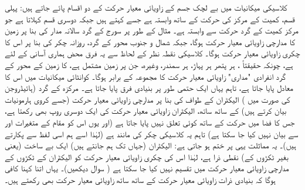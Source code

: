 کلاسیکی میکانیات میں بے لچک جسم کے زاویائی معیار حرکت کے دو اقسام پائے جاتے ہیں:  پہلی قسم،   کمیت کے مرکز کی  حرکت کے ساتھ وابستہ ہے جسے     کہتے ہیں جبکہ دوسری  قسم   
  کہلاتا ہے  جو مرکز کمیت کے گرد حرکت سے وابستہ ہے۔ مثال کے طور پر سورج کے گرد سالانہ مدار کی بنا پر زمین کا مدارچی زاویائی معیار حرکت ہوگا، جبکہ شمال و  جنوب محور کے گرد، روزانہ چکر کی بنا پر اس کا چکری زاویائی معیار حرکت ہوگا۔  کلاسیکی  نقطہ نظر کے لحاظ سے  یہ فرق  محض ہماری آسانی کے لئے ہے،  چونکہ حقیقتاً ،  ہر پتھر ہر پہاڑ، ہر سمندر،  وغیرہ،  جن پر زمین مشتمل ہے،  کا زمین کے محور کے گرد انفرادی "مداری" زاویائی معیار حرکت کا مجموعہ   کے برابر ہوگا۔  کوانٹائی میکانیات میں اس کا معادل پایا جاتا ہے، تاہم  یہاں ایک حتمی  طور پر  بنیادی فرق پایا جاتا ہے۔ مرکزہ کے گرد  (ہائیڈروجن کی صورت میں )  الیکٹران کے  طواف کی بنا پر مدارچی زاویائی معیار حرکت (جسے کروی ہارمونیات بیان کرتے ہیں) کے ساتھ ساتھ،  الیکٹران زاویائی معیار حرکت کی ایک دوسری روپ بھی رکھتا ہے، جس کا فضا میں حرکت کے ساتھ کوئی تعلق نہیں پایا جاتا ہے (اور یوں  اس کو مقام کے متغیرات   اور  سے بیان نہیں کیا جا سکتا ہے) تاہم   یہ کلاسیکی چکر کی مانند ہے (لہٰذا اسے ہم اسی لفظ سے پکارتے ہیں)۔  یہ مماثلت یہی پر ختم ہو جاتی ہے:   الیکٹران (جہاں تک ہم جانتے ہیں) ایک   بے ساخت (یعنی بغیر ٹکڑوں کے)   نقطی ذرا ہے،  لہٰذا اس کی چکری زاویائی معیار حرکت کو الیکٹران  کے ٹکڑوں کے  مدارچی زاویائی معیار حرکت   میں تقسیم نہیں کیا  جا سکتا ہے ( سوال  دیکھیں)۔   یہاں اتنا کہنا کافی ہوگا کہ بنیادی ذرات    زاویائی معیار حرکت  کے ساتھ ساتھ     زاویائی معیار حرکت  بھی رکھتے ہیں۔

